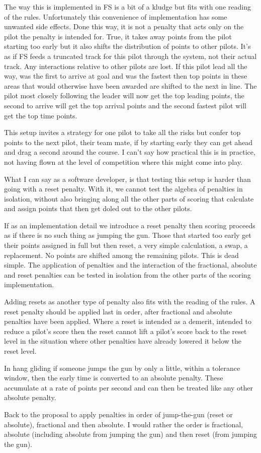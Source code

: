 \documentclass{article}
\begin{document}
The way this is implemented in FS is a bit of a kludge but fits with one
reading of the rules. Unfortunately this convenience of implementation has
some unwanted side effects. Done this way, it is not a penalty that acts only
on the pilot the penalty is intended for. True, it takes away points from the
pilot starting too early but it also shifts the distribution of points to
other pilots. It's as if FS feeds a truncated track for this pilot through
the system, not their actual track. Any interactions relative to other pilots
are lost. If this pilot lead all the way, was the first to arrive at goal and
was the fastest then top points in these areas that would otherwise have been
awarded are shifted to the next in line. The pilot most closely following the
leader will now get the top leading points, the second to arrive will get the
top arrival points and the second fastest pilot will get the top time points.

This setup invites a strategy for one pilot to take all the risks but confer
top points to the next pilot, their team mate, if by starting early they can
get ahead and drag a second around the course. I can't say how practical this
is in practice, not having flown at the level of competition where this might
come into play.

What I can say as a software developer, is that testing this setup is harder
than going with a reset penalty. With it, we cannot test the algebra of
penalties in isolation, without also bringing along all the other parts of
scoring that calculate and assign points that then get doled out to the other
pilots.

If as an implementation detail we introduce a reset penalty then scoring
proceeds as if there is no such thing as jumping the gun. Those that started
too early get their points assigned in full but then reset, a very simple
calculation, a swap, a replacement. No points are shifted among the remaining
pilots. This is dead simple. The application of penalties and the interaction
of the fractional, absolute and reset penalties can be tested in isolation
from the other parts of the scoring implementation.

Adding resets as another type of penalty also fits with the reading of the
rules. A reset penalty should be applied last in order, after fractional and
absolute penalties have been applied. Where a reset is intended as a demerit,
intended to reduce a pilot's score then the reset cannot lift a pilot's score
back to the reset level in the situation where other penalties have already
lowered it below the reset level.

In hang gliding if someone jumps the gun by only a little, within a tolerance
window, then the early time is converted to an absolute penalty. These
accumulate at a rate of points per second and can then be treated like any
other absolute penalty.

Back to the proposal to apply penalties in order of jump-the-gun (reset or
absolute), fractional and then absolute. I would rather the order is
fractional, absolute (including absolute from jumping the gun) and then
reset (from jumping the gun).
\end{document}
